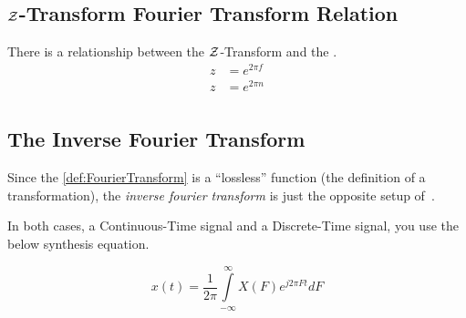 \subsection{\texorpdfstring{$\operatorname{\mathcal{Z}}$-Transform Fourier Transform Relation}{Z-Transform Fourier Transform Relation}}\label{subsec:ZTransformFourierTransformRelation}
There is a relationship between the $\operatorname{\mathcal{Z}}$-Transform and the .
\begin{equation}\label{eq:ZTransformFourierTransformRelation}
  \begin{aligned}
    z &= e^{2\pi f} \\
    z &= e^{2\pi n} \\
  \end{aligned}
\end{equation}

\subsection{The Inverse Fourier Transform}\label{subsec:InverseFourierTransform}
\begin{definition}\label{def:InverseFourierTransform}
  Since the \ref{def:FourierTransform} is a ``lossless'' function (the definition of a transformation), the \emph{inverse fourier transform} is just the opposite setup of~.

  In both cases, a Continuous-Time signal and a Discrete-Time signal, you use the below synthesis equation.
  
  \begin{equation}\label{eq:InverseFourierTransform-Continuous}
    x(t) = \frac{1}{2\pi} \int\limits_{-\infty}^{\infty} X(F) e^{j 2\pi Ft} dF
  \end{equation}
\end{definition}

